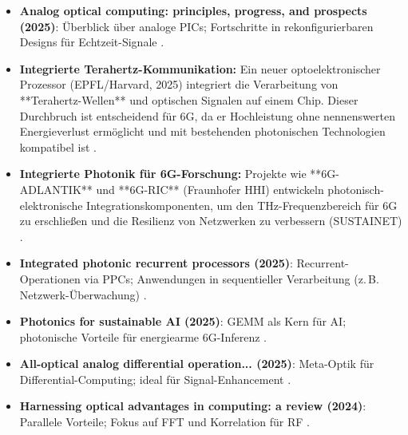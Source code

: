 	\begin{itemize}
		\item \textbf{Analog optical computing: principles, progress, and prospects (2025)}: Überblick über analoge PICs; Fortschritte in rekonfigurierbaren Designs für Echtzeit-Signale \cite{analog_optical}.
		\item \textbf{Integrierte Terahertz-Kommunikation:} Ein neuer optoelektronischer Prozessor (EPFL/Harvard, 2025) integriert die Verarbeitung von **Terahertz-Wellen** und optischen Signalen auf einem Chip. Dieser Durchbruch ist entscheidend für 6G, da er Hochleistung ohne nennenswerten Energieverlust ermöglicht und mit bestehenden photonischen Technologien kompatibel ist \cite{thz_epfl}.
		\item \textbf{Integrierte Photonik für 6G-Forschung:} Projekte wie **6G-ADLANTIK** und **6G-RIC** (Fraunhofer HHI) entwickeln photonisch-elektronische Integrationskomponenten, um den THz-Frequenzbereich für 6G zu erschließen und die Resilienz von Netzwerken zu verbessern (SUSTAINET) \cite{hhi_6g}.
		\item \textbf{Integrated photonic recurrent processors (2025)}: Recurrent-Operationen via PPCs; Anwendungen in sequentieller Verarbeitung (z.\,B. Netzwerk-Überwachung) \cite{recurrent_photonics}.
		\item \textbf{Photonics for sustainable AI (2025)}: GEMM als Kern für AI; photonische Vorteile für energiearme 6G-Inferenz \cite{photonics_ai}.
		\item \textbf{All-optical analog differential operation... (2025)}: Meta-Optik für Differential-Computing; ideal für Signal-Enhancement \cite{differential_optical}.
		\item \textbf{Harnessing optical advantages in computing: a review (2024)}: Parallele Vorteile; Fokus auf FFT und Korrelation für RF \cite{optical_advantages}.
	\end{itemize}
	
